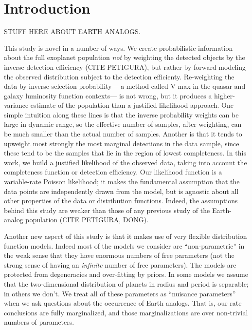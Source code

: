 \documentclass[12pt,preprint]{aastex}
\begin{document}

\section{Introduction}

STUFF HERE ABOUT EARTH ANALOGS.

This study is novel in a number of ways.
We create probabilistic information about the full exoplanet population
  \emph{not} by weighting the detected objects by the inverse detection efficiency (CITE PETIGURA),
  but rather by forward modeling the observed distribution subject to the detection efficienty.
Re-weighting the data by inverse selection probability---%
  a method called V-max in the quasar and galaxy luminosity function contexts---%
  is not wrong,
  but it produces a higher-variance estimate of the population than a justified likelihood approach.
One simple intuition along these lines is that the inverse probability weights can be large in dynamic range,
  so the effective number of samples, after weighting, can be much smaller than the actual number of samples.
Another is that it tends to upweight most strongly the most marginal detections in the data sample,
  since these tend to be the samples that lie in the region of lowest completeness.
In this work, we build a justified likelihood of the observed data,
  taking into account the completeness function or detection efficiency.
Our likelihood function is a variable-rate Poisson likelihood;
  it makes the fundamental assumption that the data points are independently drawn from the model,
  but is agnostic about all other properties of the data or distribution functions.
Indeed, the assumptions behind this study are weaker than those of any previous study
  of the Earth-analog population (CITE PETIGURA, DONG).

Another new aspect of this study is that it makes use of very flexible distribution function models.
Indeed most of the models we consider are ``non-parametric'' in the weak sense
  that they have enormous numbers of free parameters
  (not the strong sense of having an \emph{infinite} number of free parameters).
The models are protected from degeneracies and over-fitting by priors.
In some models we assume that the two-dimensional distribution of planets
  in radius and period is separable;
  in others we don't.
We treat all of these parameters as ``nuisance parameters'' when we ask questions
  about the occurrence of Earth analogs.
That is, our rate conclusions are fully marginalized,
  and those marginalizations are over non-trivial numbers of parameters.
\end{document}
